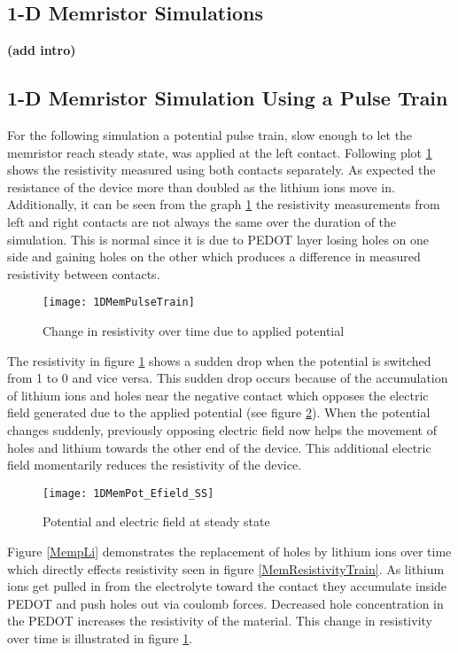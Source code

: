 \begin{doublespace}
\clearpage
\section{1-D Memristor Simulations}
\textbf{(add intro)}
\subsection{1-D Memristor Simulation Using a Pulse Train}
  
For the following simulation a potential pulse train, slow enough to let the memristor reach steady state, was applied at the left contact. Following plot \ref{MemResTrain} shows the resistivity measured using both contacts separately. As expected the resistance of the device more than doubled as the lithium ions move in. Additionally, it can be seen from the graph \ref{MemResTrain} the resistivity measurements from left and right contacts are not always the same over the duration of the simulation. This is normal since it is due to PEDOT layer losing holes on one side and gaining holes on the other which produces a difference in measured resistivity between contacts. 

\begin{figure}[!htp]
\centering
\texttt{[image: 1DMemPulseTrain]}
\caption{Change in resistivity over time due to applied potential} 
\label{MemResTrain}
\end{figure}

The resistivity in figure \ref{MemResTrain} shows a sudden drop when the potential is switched from 1 to 0 and vice versa. This sudden drop occurs because of the accumulation of lithium ions and holes near the negative contact which opposes the electric field generated due to the applied potential (see figure \ref{MemEss}). When the potential changes suddenly, previously opposing electric field now helps the movement of holes and lithium towards the other end of the device. This additional electric field momentarily reduces the resistivity of the device.

\begin{figure}[!htp]
\centering
\texttt{[image: 1DMemPot\_Efield\_SS]}
\caption{Potential and electric field at steady state} 
\label{MemEss}
\end{figure}

Figure \ref{MempLi} demonstrates the replacement of holes by lithium ions over time which directly effects resistivity seen in figure \ref{MemResistivityTrain}.  As lithium ions get pulled in from the electrolyte toward the contact they accumulate inside PEDOT and push holes out via coulomb forces. Decreased hole concentration in the PEDOT increases the resistivity of the material. This change in resistivity over time is illustrated in figure \ref{MemResTrain}.


\end{doublespace}
